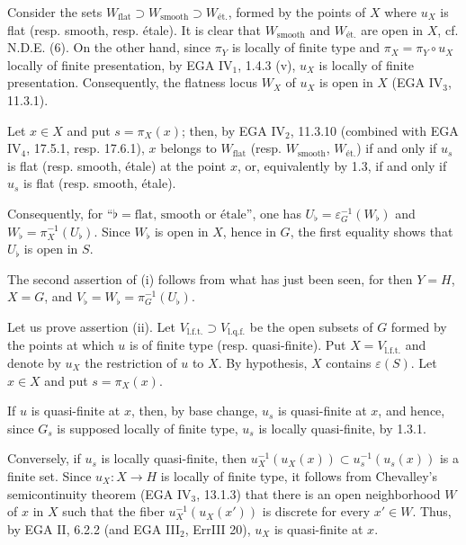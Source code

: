 Consider the sets $W_{\mathrm{flat}}\supset W_{\mathrm{smooth}}\supset W_{\text{ét.}}$, formed by the points of $X$ where $u_X$ is flat (resp. smooth, resp. étale). It is clear that $W_{\mathrm{smooth}}$ and $W_{\text{ét.}}$ are open in $X$, cf. N.D.E. (6). On the other hand, since $\pi_Y$ is locally of finite type and $\pi_X=\pi_Y\circ u_X$ locally of finite presentation, by EGA IV$_1$, 1.4.3 (v), $u_X$ is locally of finite presentation. Consequently, the flatness locus $W_X$ of $u_X$ is open in $X$ (EGA IV$_3$, 11.3.1).

Let $x\in X$ and put $s=\pi_X(x)$; then, by EGA IV$_2$, 11.3.10 (combined with EGA IV$_4$, 17.5.1, resp. 17.6.1), $x$ belongs to $W_{\mathrm{flat}}$ (resp. $W_{\mathrm{smooth}}$, $W_{\text{ét.}}$) if and only if $u_s$ is flat (resp. smooth, étale) at the point $x$, or, equivalently by 1.3, if and only if $u_s$ is flat (resp. smooth, étale).

Consequently, for ``$\flat=\text{flat, smooth or étale}$'', one has $U_\flat=\varepsilon_G^{-1}(W_\flat)$ and $W_\flat=\pi_X^{-1}(U_\flat)$. Since $W_\flat$ is open in $X$, hence in $G$, the first equality shows that $U_\flat$ is open in $S$.

The second assertion of (i) follows from what has just been seen, for then $Y=H$, $X=G$, and $V_\flat=W_\flat=\pi_G^{-1}(U_\flat)$.

Let us prove assertion (ii). Let $V_{\mathrm{l.f.t.}}\supset V_{\mathrm{l.q.f.}}$ be the open subsets of $G$ formed by the points at which $u$ is of finite type (resp. quasi-finite). Put $X=V_{\mathrm{l.f.t.}}$ and denote by $u_X$ the restriction of $u$ to $X$. By hypothesis, $X$ contains $\varepsilon(S)$. Let $x\in X$ and put $s=\pi_X(x)$.

If $u$ is quasi-finite at $x$, then, by base change, $u_s$ is quasi-finite at $x$, and hence, since $G_s$ is supposed locally of finite type, $u_s$ is locally quasi-finite, by 1.3.1.

Conversely, if $u_s$ is locally quasi-finite, then $u_X^{-1}(u_X(x))\subset u_s^{-1}(u_s(x))$ is a finite set. Since $u_X:X\to H$ is locally of finite type, it follows from Chevalley's semicontinuity theorem (EGA IV$_3$, 13.1.3) that there is an open neighborhood $W$ of $x$ in $X$ such that the fiber $u_X^{-1}(u_X(x'))$ is discrete for every $x'\in W$. Thus, by EGA II, 6.2.2 (and EGA III$_2$, ErrIII 20), $u_X$ is quasi-finite at $x$.


